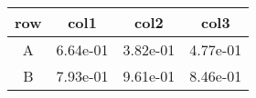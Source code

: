 \begin{tabular}{cccc}
\toprule
row&col1&col2&col3\tabularnewline
\midrule
A&6.64e-01&3.82e-01&4.77e-01\tabularnewline
B&7.93e-01&9.61e-01&8.46e-01\tabularnewline
\bottomrule
\end{tabular}

